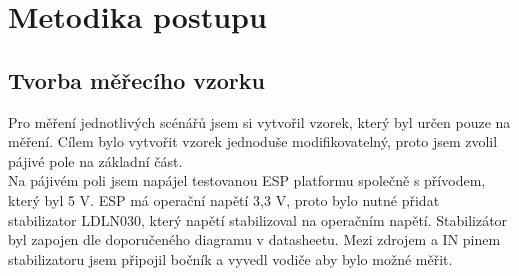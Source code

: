 \documentclass[a4paper, 12pt]{report}
\begin{document}
    \chapter{Metodika postupu}


    \section{Tvorba měřecího vzorku}
    Pro měření jednotlivých scénářů jsem si vytvořil vzorek, který byl určen pouze na měření.
    Cílem bylo vytvořit vzorek jednoduše modifikovatelný, proto jsem zvolil pájivé pole na základní část.\\
    Na pájivém poli jsem napájel testovanou ESP platformu společně s přívodem, který byl 5 V. ESP má operační napětí 3,3 V, proto bylo nutné přidat stabilizator LDLN030, který napětí stabilizoval na operačním napětí.
    Stabilizátor byl zapojen dle doporučeného diagramu v datasheetu.
    Mezi zdrojem a IN pinem stabilizatoru jsem připojil bočník a vyvedl vodiče aby bylo možné měřit.
\end{document}
